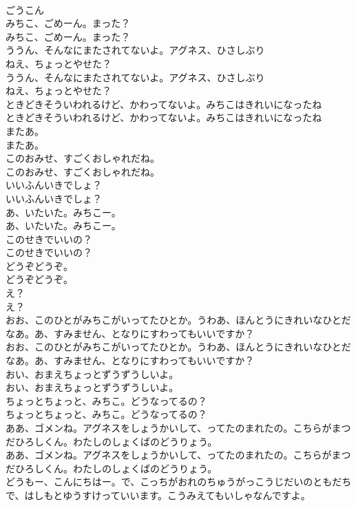 \documentclass[8pt]{extreport}
\begin{document}
\begin{CJK}{UTF8}{min}
\\	ごうこん
\\	みちこ、ごめーん。まった？
\\	みちこ、ごめーん。まった？
\\	ううん、そんなにまたされてないよ。アグネス、ひさしぶり
\\	ねえ、ちょっとやせた？
\\	ううん、そんなにまたされてないよ。アグネス、ひさしぶり
\\	ねえ、ちょっとやせた？
\\	ときどきそういわれるけど、かわってないよ。みちこはきれいになったね
\\	ときどきそういわれるけど、かわってないよ。みちこはきれいになったね
\\	またあ。
\\	またあ。
\\	このおみせ、すごくおしゃれだね。
\\	このおみせ、すごくおしゃれだね。
\\	いいふんいきでしょ？
\\	いいふんいきでしょ？
\\	あ、いたいた。みちこー。
\\	あ、いたいた。みちこー。
\\	このせきでいいの？
\\	このせきでいいの？
\\	どうぞどうぞ。
\\	どうぞどうぞ。
\\	え？
\\	え？
\\	おお、このひとがみちこがいってたひとか。うわあ、ほんとうにきれいなひとだなあ。あ、すみません、となりにすわってもいいですか？
\\	おお、このひとがみちこがいってたひとか。うわあ、ほんとうにきれいなひとだなあ。あ、すみません、となりにすわってもいいですか？
\\	おい、おまえちょっとずうずうしいよ。
\\	おい、おまえちょっとずうずうしいよ。
\\	ちょっとちょっと、みちこ。どうなってるの？
\\	ちょっとちょっと、みちこ。どうなってるの？
\\	ああ、ゴメンね。アグネスをしょうかいして、ってたのまれたの。こちらがまつだひろしくん。わたしのしょくばのどうりょう。
\\	ああ、ゴメンね。アグネスをしょうかいして、ってたのまれたの。こちらがまつだひろしくん。わたしのしょくばのどうりょう。
\\	どうもー、こんにちはー。で、こっちがおれのちゅうがっこうじだいのともだちで、はしもとゆうすけっていいます。こうみえてもいしゃなんですよ。

\end{CJK}
\end{document}
